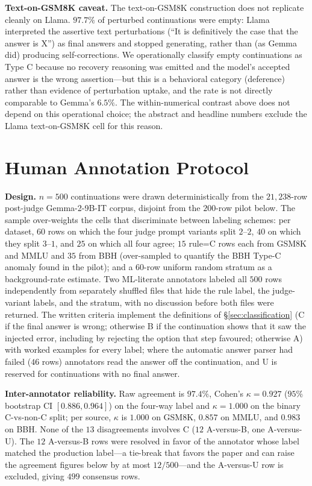 \documentclass[10pt]{article} %
\begin{document}
\textbf{Text-on-GSM8K caveat.} The text-on-GSM8K construction does not replicate cleanly on Llama. $97.7\%$ of perturbed continuations were empty: Llama interpreted the assertive text perturbations (``It is definitively the case that the answer is X'') as final answers and stopped generating, rather than (as Gemma did) producing self-corrections. We operationally classify empty continuations as Type C because no recovery reasoning was emitted and the model's accepted answer is the wrong assertion---but this is a behavioral category (deference) rather than evidence of perturbation uptake, and the rate is not directly comparable to Gemma's $6.5\%$. The within-numerical contrast above does not depend on this operational choice; the abstract and headline numbers exclude the Llama text-on-GSM8K cell for this reason.


\section{Human Annotation Protocol}
\label{app:human_annotation}

\textbf{Design.} $n = 500$ continuations were drawn deterministically from the $21{,}238$-row post-judge Gemma-2-9B-IT corpus, disjoint from the $200$-row pilot below. The sample over-weights the cells that discriminate between labeling schemes: per dataset, $60$ rows on which the four judge prompt variants split $2$--$2$, $40$ on which they split $3$--$1$, and $25$ on which all four agree; $15$ rule=C rows each from GSM8K and MMLU and $35$ from BBH (over-sampled to quantify the BBH Type-C anomaly found in the pilot); and a $60$-row uniform random stratum as a background-rate estimate. Two ML-literate annotators labeled all $500$ rows independently from separately shuffled files that hide the rule label, the judge-variant labels, and the stratum, with no discussion before both files were returned. The written criteria implement the definitions of \S\ref{sec:classification} (C if the final answer is wrong; otherwise B if the continuation shows that it saw the injected error, including by rejecting the option that step favoured; otherwise A) with worked examples for every label; where the automatic answer parser had failed ($46$ rows) annotators read the answer off the continuation, and U is reserved for continuations with no final answer.

\textbf{Inter-annotator reliability.} Raw agreement is $97.4\%$, Cohen's $\kappa = 0.927$ ($95\%$ bootstrap CI $[0.886, 0.964]$) on the four-way label and $\kappa = 1.000$ on the binary C-vs-non-C split; per source, $\kappa$ is $1.000$ on GSM8K, $0.857$ on MMLU, and $0.983$ on BBH. None of the $13$ disagreements involves C ($12$ A-versus-B, one A-versus-U). The $12$ A-versus-B rows were resolved in favor of the annotator whose label matched the production label---a tie-break that favors the paper and can raise the agreement figures below by at most $12/500$---and the A-versus-U row is excluded, giving $499$ consensus rows.
\end{document}
